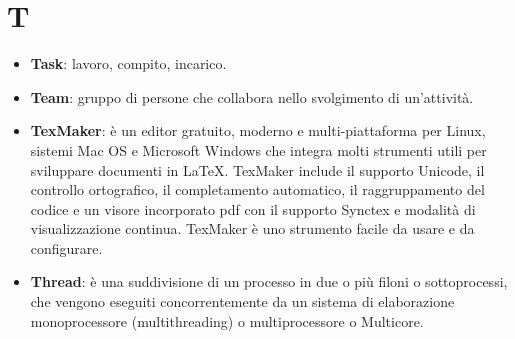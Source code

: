 \section{T}
\begin{itemize}
	\item
	\textbf{Task}: lavoro, compito, incarico.
	\item
	\textbf{Team}: gruppo di persone che collabora nello svolgimento di un'attività.
	\item
	\textbf{TexMaker}: è un editor gratuito, moderno e multi-piattaforma per Linux, sistemi Mac OS e Microsoft Windows che integra molti strumenti utili per sviluppare documenti in \LaTeX{}.
	TexMaker include il supporto Unicode, il controllo ortografico, il completamento automatico, il raggruppamento del codice e un visore incorporato pdf con il supporto Synctex e modalità di visualizzazione continua.
	TexMaker è uno strumento facile da usare e da configurare.
	\item
	\textbf{Thread}:  è una suddivisione di un processo in due o più filoni o sottoprocessi, che vengono eseguiti concorrentemente da un sistema di elaborazione monoprocessore (multithreading) o multiprocessore o Multicore.
	
\end{itemize}
